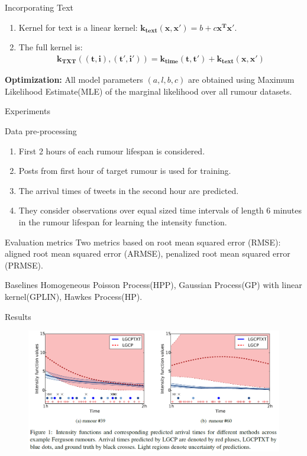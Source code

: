 \documentclass{beamer}
\providecommand{\brak}[1]{\ensuremath{\left(#1\right)}}
\let\vec\mathbf
\begin{document}
\begin{frame}{Incorporating Text}
\begin{enumerate}
    \item Kernel for text is a linear kernel:  $\vec{k_{text}\brak{x,x'}} = b + c \vec{x^T x'}$.
    \item The full kernel is: 
    \begin{align}
        \vec{k_{TXT}\brak{\brak{t,i},\brak{t',i'}}}= \vec{k_{time}\brak{t,t'}} + \vec{k_{text}\brak{x,x'}}
    \end{align}
\end{enumerate}

\textbf{Optimization:} All model parameters $\brak{a,l,b,c}$ are obtained using Maximum Likelihood Estimate(MLE) of the marginal likelihood over all rumour datasets.
\end{frame}

\begin{frame}{Experiments}
\begin{block}{Data pre-processing}
    \begin{enumerate}
        \item First 2 hours of each rumour lifespan is considered.
        \item Posts from first hour of target rumour is used for training.
        \item The arrival times of tweets in the second hour are predicted.
        \item They consider observations over equal sized time intervals of length 6 minutes in the rumour lifespan for learning the intensity function.
    \end{enumerate}
\end{block}
\begin{block}{Evaluation metrics}
        Two metrics based on root mean squared error (RMSE): aligned root mean squared error (ARMSE), penalized root mean squared error (PRMSE).
\end{block}
\begin{block}{Baselines}
    Homogeneous Poisson Process(HPP), Gaussian Process(GP) with linear kernel(GPLIN), Hawkes Process(HP).   
\end{block}
\end{frame}

\begin{frame}{Results}
\begin{figure}
\includegraphics[width=\columnwidth]{predictions.PNG}
\label{results}
\end{figure}
\end{frame}
\end{document}
